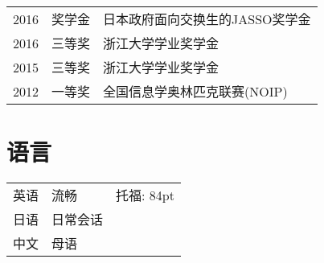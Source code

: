 \documentclass[]{deedy-resume-openfont}
\begin{document}
\begin{minipage}[t]{0.73\textwidth}
\begin{tabular}{rll}
2016      & 奖学金 & 日本政府面向交换生的JASSO奖学金 \\
2016	     & 三等奖  & 浙江大学学业奖学金 \\
2015	     & 三等奖  & 浙江大学学业奖学金 \\
2012	     & 一等奖  & 全国信息学奥林匹克联赛(NOIP)\\
\end{tabular}
\sectionsep



\section{语言} 

\begin{tabular}{rll}

英语   & 流畅 & 托福: 84pt \\
日语	     & 日常会话 &   \\
中文	     & 母语  &  \\
\end{tabular}


% 
% 

\end{minipage} 
\end{document}
